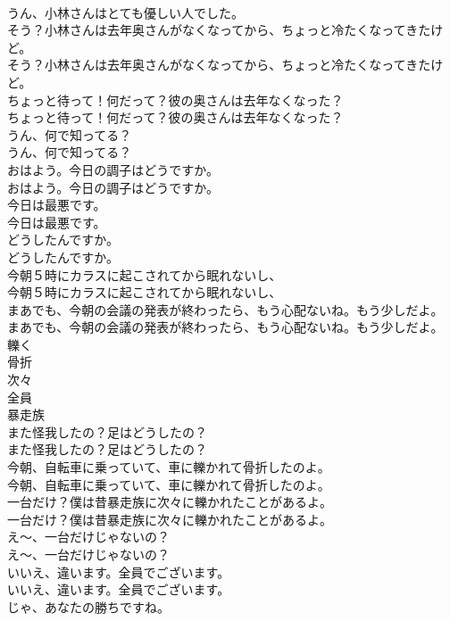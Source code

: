 \documentclass[8pt]{extreport}
\begin{document}
\begin{CJK}{UTF8}{min}
\\	うん、小林さんはとても優しい人でした。 
\\	そう？小林さんは去年奥さんがなくなってから、ちょっと冷たくなってきたけど。	
\\	そう？小林さんは去年奥さんがなくなってから、ちょっと冷たくなってきたけど。 
\\	ちょっと待って！何だって？彼の奥さんは去年なくなった？	
\\	ちょっと待って！何だって？彼の奥さんは去年なくなった？ 
\\	うん、何で知ってる？	
\\	うん、何で知ってる？ 
\\	おはよう。今日の調子はどうですか。	
\\	おはよう。今日の調子はどうですか。 
\\	今日は最悪です。	
\\	今日は最悪です。 
\\	どうしたんですか。	
\\	どうしたんですか。 
\\	今朝５時にカラスに起こされてから眠れないし、	
\\	今朝５時にカラスに起こされてから眠れないし、 
\\	まあでも、今朝の会議の発表が終わったら、もう心配ないね。もう少しだよ。	
\\	まあでも、今朝の会議の発表が終わったら、もう心配ないね。もう少しだよ。 
\\	轢く
\\	骨折
\\	次々
\\	全員
\\	暴走族
\\	また怪我したの？足はどうしたの？	
\\	また怪我したの？足はどうしたの？ 
\\	今朝、自転車に乗っていて、車に轢かれて骨折したのよ。	
\\	今朝、自転車に乗っていて、車に轢かれて骨折したのよ。 
\\	一台だけ？僕は昔暴走族に次々に轢かれたことがあるよ。	
\\	一台だけ？僕は昔暴走族に次々に轢かれたことがあるよ。 
\\	え～、一台だけじゃないの？	
\\	え～、一台だけじゃないの？ 
\\	いいえ、違います。全員でございます。	
\\	いいえ、違います。全員でございます。 
\\	じゃ、あなたの勝ちですね。	

\end{CJK}
\end{document}
